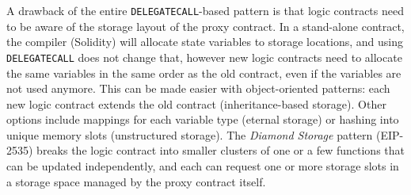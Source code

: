 A drawback of the entire \texttt{DELEGATECALL}-based pattern is that logic contracts need to be aware of the storage layout of the proxy contract. In a stand-alone contract, the compiler (\eg Solidity) will allocate state variables to storage locations, and using \texttt{DELEGATECALL} does not change that, however new logic contracts need to allocate the same variables in the same order as the old contract, even if the variables are not used anymore. This can be made easier with object-oriented patterns: each new logic contract extends the old contract (inheritance-based storage). Other options include mappings for each variable type (eternal storage) or hashing into unique memory slots (unstructured storage). The \textit{Diamond Storage} pattern (EIP-2535) breaks the logic contract into smaller clusters of one or a few functions that can be updated independently, and each can request one or more storage slots in a storage space managed by the proxy contract itself. 







